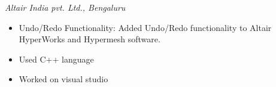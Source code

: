 \documentclass[
	a4paper,
]{fortysecondscv}
\begin{document}







		
    	


\vspace{-1pt}
\begin{cvtable}[0.5]
	{\hspace{-72} \emph{Altair India pvt. Ltd., Bengaluru}
	\vspace{-5pt}
	\begin{itemize}[leftmargin=-2cm]
	\item Undo/Redo Functionality: Added Undo/Redo functionality to Altair HyperWorks and Hypermesh software.
	\item Used C++ language  
	\item Worked on visual studio
     \vspace{-5pt}
	\end{itemize}
	}


\end{cvtable}
\vspace{-1pt}
\end{document}
